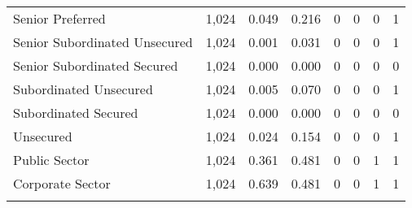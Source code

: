 \begin{table}[!htbp]
\begin{tabular}{@{\extracolsep{5pt}}lccccccc}
Senior Preferred & 1,024 & 0.049 & 0.216 & 0 & 0 & 0 & 1 \\ 
Senior Subordinated Unsecured & 1,024 & 0.001 & 0.031 & 0 & 0 & 0 & 1 \\ 
Senior Subordinated Secured & 1,024 & 0.000 & 0.000 & 0 & 0 & 0 & 0 \\ 
Subordinated Unsecured & 1,024 & 0.005 & 0.070 & 0 & 0 & 0 & 1 \\ 
Subordinated Secured & 1,024 & 0.000 & 0.000 & 0 & 0 & 0 & 0 \\ 
Unsecured & 1,024 & 0.024 & 0.154 & 0 & 0 & 0 & 1 \\ 
Public Sector & 1,024 & 0.361 & 0.481 & 0 & 0 & 1 & 1 \\ 
Corporate Sector & 1,024 & 0.639 & 0.481 & 0 & 0 & 1 & 1 \\ 
\hline \\[-1.8ex] 
\end{tabular} 
\end{table}



